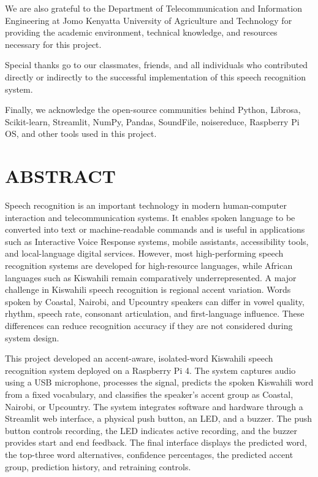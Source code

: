 \documentclass[12pt,a4paper]{report}
\begin{document}
We are also grateful to the Department of Telecommunication and Information Engineering at Jomo Kenyatta University of Agriculture and Technology for providing the academic environment, technical knowledge, and resources necessary for this project.

Special thanks go to our classmates, friends, and all individuals who contributed directly or indirectly to the successful implementation of this speech recognition system.

Finally, we acknowledge the open-source communities behind Python, Librosa, Scikit-learn, Streamlit, NumPy, Pandas, SoundFile, noisereduce, Raspberry Pi OS, and other tools used in this project.

\chapter*{ABSTRACT}
Speech recognition is an important technology in modern human-computer interaction and telecommunication systems. It enables spoken language to be converted into text or machine-readable commands and is useful in applications such as Interactive Voice Response systems, mobile assistants, accessibility tools, and local-language digital services. However, most high-performing speech recognition systems are developed for high-resource languages, while African languages such as Kiswahili remain comparatively underrepresented. A major challenge in Kiswahili speech recognition is regional accent variation. Words spoken by Coastal, Nairobi, and Upcountry speakers can differ in vowel quality, rhythm, speech rate, consonant articulation, and first-language influence. These differences can reduce recognition accuracy if they are not considered during system design.

This project developed an accent-aware, isolated-word Kiswahili speech recognition system deployed on a Raspberry Pi 4. The system captures audio using a USB microphone, processes the signal, predicts the spoken Kiswahili word from a fixed vocabulary, and classifies the speaker's accent group as Coastal, Nairobi, or Upcountry. The system integrates software and hardware through a Streamlit web interface, a physical push button, an LED, and a buzzer. The push button controls recording, the LED indicates active recording, and the buzzer provides start and end feedback. The final interface displays the predicted word, the top-three word alternatives, confidence percentages, the predicted accent group, prediction history, and retraining controls.
\end{document}
